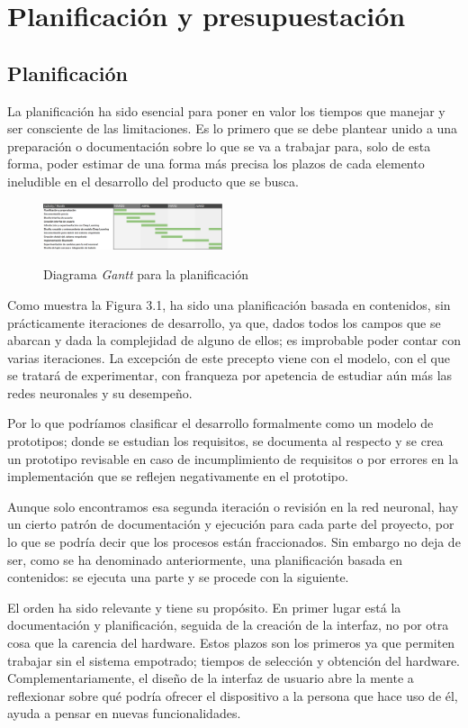 \section{Planificación y presupuestación}
\subsection{Planificación}
La planificación ha sido esencial para poner en valor los tiempos que manejar
y ser consciente de las limitaciones.
Es lo primero que se debe plantear unido a una preparación o documentación
sobre lo que se va a trabajar para, solo de esta forma, poder estimar de una
forma más precisa los plazos de cada elemento ineludible en el desarrollo
del producto que se busca.
\begin{figure}[]
    \centering
    \includegraphics[angle=270,width=0.47\textwidth]{capturas/ganttFixed.png}\\[-0,20cm]
    \caption{Diagrama \textit{Gantt} para la planificación}
\end{figure}
\newpage
Como muestra la Figura 3.1, ha sido una planificación basada en contenidos, sin prácticamente iteraciones
de desarrollo, ya que, dados todos los campos que se abarcan
y dada la complejidad de alguno de ellos; es improbable poder
contar con varias iteraciones. La excepción de este precepto viene
con el modelo, con el que se tratará de experimentar, con franqueza
por apetencia de estudiar aún más las redes neuronales y su desempeño.

Por lo que podríamos clasificar el desarrollo formalmente como un modelo de prototipos;
donde se estudian los requisitos, se documenta al respecto y se crea un
prototipo revisable en caso de incumplimiento de requisitos o por
errores en la implementación que se reflejen negativamente en el prototipo.

Aunque solo encontramos esa segunda iteración o revisión en la red neuronal,
hay un cierto patrón de documentación y ejecución para cada parte del
proyecto, por lo que se podría decir que los procesos están fraccionados.
Sin embargo no deja de ser, como se ha denominado anteriormente, una
planificación basada en contenidos: se ejecuta una parte y se procede con
la siguiente.

El orden ha sido relevante y tiene su propósito. En primer lugar
está la documentación  y planificación, seguida de la creación de
la interfaz, no por otra cosa que la carencia del hardware. Estos plazos
son los primeros ya que permiten trabajar sin el sistema empotrado; tiempos
de selección y obtención del hardware. Complementariamente, el diseño
de la interfaz de usuario abre la mente a reflexionar sobre qué podría
ofrecer el dispositivo a la persona que hace uso de él, ayuda a pensar
en nuevas funcionalidades.

